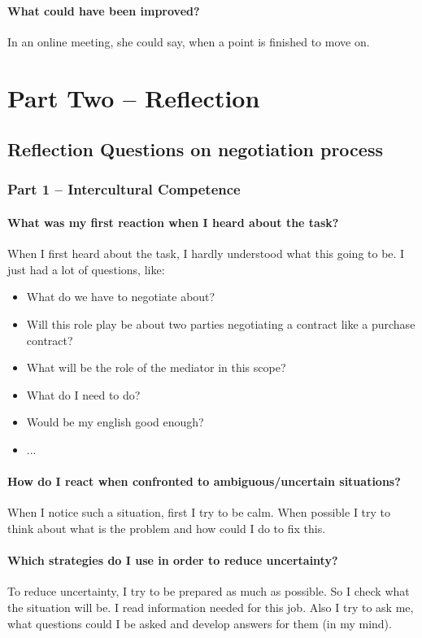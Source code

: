 \documentclass[11pt,fleqn]{book} %
\begin{document}
\subsection{What could have been improved?}
In an online meeting, she could say, when a point is finished to move on.


\part{Part Two – Reflection}

\chapter{Reflection Questions on negotiation process}
\section{Part 1 – Intercultural Competence}
\subsection{What was my first reaction when I heard about the task?}
When I first heard about the task, I hardly understood what this going to be.
I just had a lot of questions, like:
\begin{itemize}
	\item What do we have to negotiate about?
	\item Will this role play be about two parties negotiating a contract like a purchase contract?
	\item What will be the role of the mediator in this scope?
	\item What do I need to do?
	\item Would be my english good enough?
	\item ...
\end{itemize}

\subsection{How do I react when confronted to ambiguous/uncertain situations?}
When I notice such a situation, first I try to be calm.
When possible I try to think about what is the problem and how could I do to fix this.

\subsection{Which strategies do I use in order to reduce uncertainty?}
To reduce uncertainty, I try to be prepared as much as possible.
So I check what the situation will be. I read information needed for this job. Also I try to ask me, what questions could I be asked and develop answers for them (in my mind).
\end{document}
